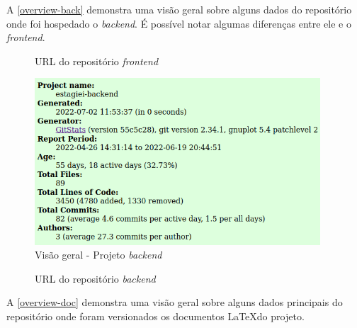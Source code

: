 A \autoref{overview-back} demonstra uma visão geral sobre alguns dados do repositório onde foi hospedado o \textit{\gls{backend}}. É possível notar algumas diferenças entre ele e o \textit{\gls{frontend}}.

\begin{figure}[htb]
	\caption{\label{qr-url-front}URL do repositório \textit{\gls{frontend}}}
	\begin{center}
	\end{center}
\end{figure}

\begin{figure}[H]
	\centering
	\caption{\label{overview-back}Visão geral - Projeto \textit{\gls{backend}}}
	\includegraphics[width=0.95\textwidth]{../imagens/stats/overview-backend.png}
\end{figure}

\begin{figure}[htb]
	\caption{\label{qr-url-back}URL do repositório \textit{\gls{backend}}}
	\begin{center}
	\end{center}
\end{figure}

A \autoref{overview-doc} demonstra uma visão geral sobre alguns dados principais do repositório onde foram versionados os documentos \LaTeX do projeto.

